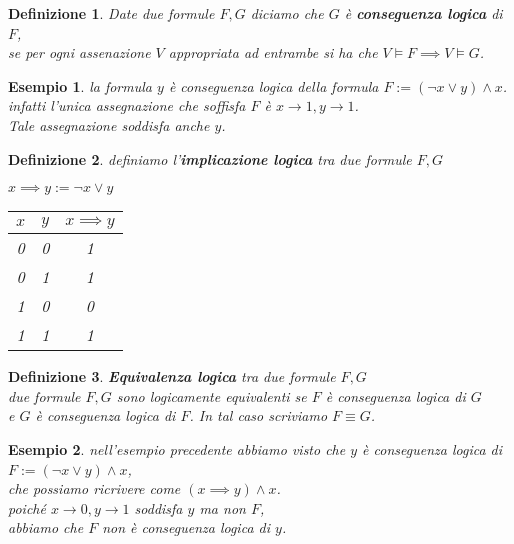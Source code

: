 \documentclass[a4paper,12pt]{article}
\theoremstyle{def}
\newtheorem*{definition}{Definizione}
\theoremstyle{prop}
\theoremstyle{esempio}
\newtheorem*{example}{Esempio}
\theoremstyle{dimostrazione}
\theoremstyle{teo}
\theoremstyle{osservazione}
\begin{document}
\begin{definition}
	Date due formule \(F,G\) diciamo che \(G\) è \textbf{conseguenza logica} di \(F\),\\
	se per ogni assenazione \(V\) appropriata ad entrambe si ha che \(V \vDash F \implies V \vDash G\).
\end{definition}
\begin{example}
	la formula \(y\) è conseguenza logica della formula \(F := (\neg x \lor y) \land x\).\\
	infatti l'unica assegnazione che soffisfa \(F\) è \(x \rightarrow 1, y \rightarrow 1\).\\
	Tale assegnazione soddisfa anche \(y\).
\end{example}
\begin{definition}
	definiamo l'\textbf{implicazione logica} tra due formule \(F,G\)\\
	\begin{center}
		\(x \implies y := \neg x \lor y\)\\
		\begin{tabular}{c|c|c}
			\hline
                \(x\) & \(y\) & \(x \implies y\) \\
                \hline
                0 & 0 & 1 \\
                0 & 1 & 1 \\
                1 & 0 & 0 \\
                1 & 1 & 1 \\
		\end{tabular}
	\end{center}
\end{definition}
\begin{definition}
	\textbf{Equivalenza logica} tra due formule \(F,G\)\\
	due formule \(F,G\) sono logicamente equivalenti se \(F\) è conseguenza logica di \(G\)\\
	e \(G\) è conseguenza logica di \(F\). In tal caso scriviamo \(F \equiv G\).
\end{definition}
\begin{example}
	nell'esempio precedente abbiamo visto che \(y\) è conseguenza logica di \(F:= (\neg x \lor y) \land x \),\\
	che possiamo ricrivere come \((x \implies y) \land x\).\\
	poiché \(x \rightarrow 0, y \rightarrow 1\) soddisfa \(y\) ma non \(F\),\\
	abbiamo che \(F\) non è conseguenza logica di \(y\).\\
\end{example}
\end{document}
